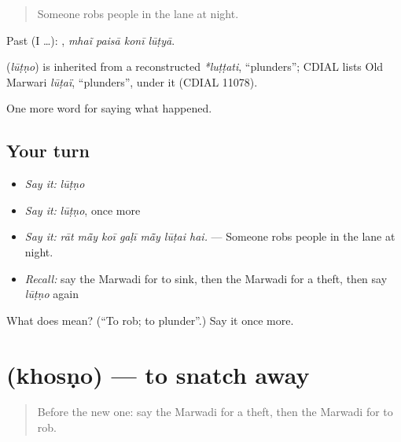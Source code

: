 \begin{quote}
Someone robs people in the lane at night.
\end{quote}

Past (I …):    , \emph{mhaĩ paisā konī lūṭyā}.

\begin{cousinweb}
\textbf{} (\emph{lūṭṇo}) is inherited from a reconstructed \emph{*luṭṭati}, \textquotedblleft{}plunders\textquotedblright{}; CDIAL lists Old Marwari \emph{lūṭaï}, \textquotedblleft{}plunders\textquotedblright{}, under it (CDIAL 11078).
\end{cousinweb}

\begin{grammarlens}[title={What you've built}]
One more word for saying what happened.
\end{grammarlens}

\subsection*{Your turn}
\begin{itemize}
\raggedright
  \item \emph{Say it:} \emph{lūṭṇo}
  \item \emph{Say it:} \emph{lūṭṇo}, once more
  \item \emph{Say it:} \emph{rāt mā̃y koī gaḷī mā̃y lūṭai hai.} — Someone robs people in the lane at night.
  \item \emph{Recall:} say the Marwadi for to sink, then the Marwadi for a theft, then say \emph{lūṭṇo} again
\end{itemize}

\begin{tcolorbox}[breakable,colback=teal!4,colframe=teal!35!black,title={Before you move on}]
What does  mean? (\textquotedblleft{}To rob; to plunder\textquotedblright{}.) Say it once more.
\end{tcolorbox}
\section[\texorpdfstring{\mw{खोसणो} (khosṇo)}{खोसणो (khosṇo)}]{ (khosṇo) — to snatch away}

\label{lesson:MW-C243-khosno}



\begin{quote}
Before the new one: say the Marwadi for a theft, then the Marwadi for to rob.
\end{quote}

